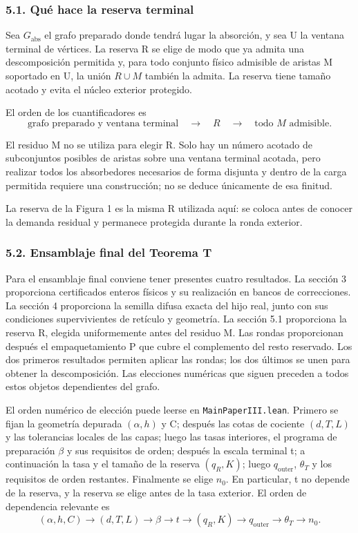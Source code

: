 \documentclass[spanish,11pt,a4paper]{article}
\begin{document}
\subsubsection{5.1. Qué hace la reserva terminal}\label{quuxe9-hace-la-reserva-terminal}

Sea \(G_{\mathrm{abs}}\) el grafo preparado donde tendrá lugar la absorción, y sea U la ventana terminal de vértices. La reserva R se elige de modo que ya admita una descomposición permitida y, para todo conjunto físico admisible de aristas M soportado en U, la unión \(R\cup M\) también la admita. La reserva tiene tamaño acotado y evita el núcleo exterior protegido.

El orden de los cuantificadores es
\[\text{grafo preparado y ventana terminal}
\quad\longrightarrow\quad R
\quad\longrightarrow\quad\text{todo }M\text{ admisible}.                \tag{5.1}\]

El residuo M no se utiliza para elegir R. Solo hay un número acotado de subconjuntos posibles de aristas sobre una ventana terminal acotada, pero realizar todos los absorbedores necesarios de forma disjunta y dentro de la carga permitida requiere una construcción; no se deduce únicamente de esa finitud.

La reserva de la Figura 1 es la misma R utilizada aquí: se coloca antes de conocer la demanda residual y permanece protegida durante la ronda exterior.

\subsubsection{5.2. Ensamblaje final del Teorema T}\label{ensamblaje-final-del-teorema-t}

Para el ensamblaje final conviene tener presentes cuatro resultados. La sección 3 proporciona certificados enteros físicos y su realización en bancos de correcciones. La sección 4 proporciona la semilla difusa exacta del hijo real, junto con sus condiciones supervivientes de retículo y geometría. La sección 5.1 proporciona la reserva R, elegida uniformemente antes del residuo M. Las rondas proporcionan después el empaquetamiento P que cubre el complemento del resto reservado. Los dos primeros resultados permiten aplicar las rondas; los dos últimos se unen para obtener la descomposición. Las elecciones numéricas que siguen preceden a todos estos objetos dependientes del grafo.

El orden numérico de elección puede leerse en \texttt{Main\allowbreak{}Paper\allowbreak{}III.\allowbreak{}lean}. Primero se fijan la geometría depurada \((\alpha,h)\) y C; después las cotas de cociente \((d,T,L)\) y las tolerancias locales de las capas; luego las tasas interiores, el programa de preparación \(\beta\) y sus requisitos de orden; después la escala terminal t; a continuación la tasa y el tamaño de la reserva \((q_R,K)\); luego \(q_{\mathrm{outer}}\), \(\theta_T\) y los requisitos de orden restantes. Finalmente se elige \(n_0\). En particular, t no depende de la reserva, y la reserva se elige antes de la tasa exterior. El orden de dependencia relevante es
\[(\alpha,h,C)\longrightarrow(d,T,L)\longrightarrow\beta\longrightarrow t\longrightarrow(q_R,K)\longrightarrow q_{\mathrm{outer}}\longrightarrow\theta_T\longrightarrow n_0.\]
\end{document}
